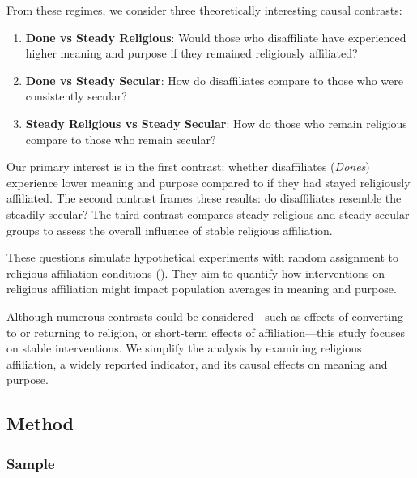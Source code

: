 \documentclass[
  single column]{article}
\providecommand{\tightlist}{%
  \setlength{\itemsep}{0pt}\setlength{\parskip}{0pt}}\usepackage{longtable,booktabs,array}
\begin{document}
From these regimes, we consider three theoretically interesting causal
contrasts:

\begin{enumerate}
\def\labelenumi{\arabic{enumi}.}
\tightlist
\item
  \textbf{Done vs Steady Religious}: Would those who disaffiliate have
  experienced higher meaning and purpose if they remained religiously
  affiliated?\\
\item
  \textbf{Done vs Steady Secular}: How do disaffiliates compare to those
  who were consistently secular?\\
\item
  \textbf{Steady Religious vs Steady Secular}: How do those who remain
  religious compare to those who remain secular?
\end{enumerate}

Our primary interest is in the first contrast: whether disaffiliates
(\emph{Dones}) experience lower meaning and purpose compared to if they
had stayed religiously affiliated. The second contrast frames these
results: do disaffiliates resemble the steadily secular? The third
contrast compares steady religious and steady secular groups to assess
the overall influence of stable religious affiliation.

These questions simulate hypothetical experiments with random assignment
to religious affiliation conditions (). They aim to quantify how interventions on
religious affiliation might impact population averages in meaning and
purpose.

Although numerous contrasts could be considered---such as effects of
converting to or returning to religion, or short-term effects of
affiliation---this study focuses on stable interventions. We simplify
the analysis by examining religious affiliation, a widely reported
indicator, and its causal effects on meaning and purpose.

\subsection{Method}\label{method}

\subsubsection{Sample}\label{sample}
\end{document}
